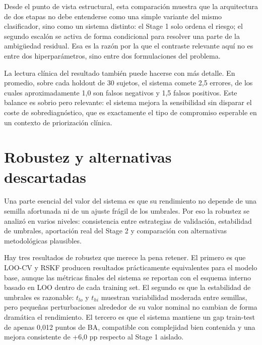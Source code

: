 Desde el punto de vista estructural, esta comparación muestra que la arquitectura de dos etapas no debe entenderse como una simple variante del mismo clasificador, sino como un sistema distinto: el Stage 1 solo ordena el riesgo; el segundo escalón se activa de forma condicional para resolver una parte de la ambigüedad residual. Esa es la razón por la que el contraste relevante aquí no es entre dos hiperparámetros, sino entre dos formulaciones del problema.

La lectura clínica del resultado también puede hacerse con más detalle. En promedio, sobre cada holdout de 30 sujetos, el sistema comete 2,5 errores, de los cuales aproximadamente 1,0 son falsos negativos y 1,5 falsos positivos. Este balance es sobrio pero relevante: el sistema mejora la sensibilidad sin disparar el coste de sobrediagnóstico, que es exactamente el tipo de compromiso esperable en un contexto de priorización clínica.

\section{Robustez y alternativas descartadas}\label{sec:robustez}

Una parte esencial del valor del sistema es que su rendimiento no depende de una semilla afortunada ni de un ajuste frágil de los umbrales. Por eso la robustez se analizó en varios niveles: consistencia entre estrategias de validación, estabilidad de umbrales, aportación real del Stage 2 y comparación con alternativas metodológicas plausibles.

Hay tres resultados de robustez que merece la pena retener. El primero es que LOO-CV y RSKF producen resultados prácticamente equivalentes para el modelo base, aunque las métricas finales del sistema se reportan con el esquema interno basado en LOO dentro de cada training set. El segundo es que la estabilidad de umbrales es razonable: $t_{lo}$ y $t_{hi}$ muestran variabilidad moderada entre semillas, pero pequeñas perturbaciones alrededor de su valor nominal no cambian de forma dramática el rendimiento. El tercero es que el sistema mantiene un gap train-test de apenas 0,012 puntos de BA, compatible con complejidad bien contenida y una mejora consistente de +6,0 pp respecto al Stage 1 aislado.

